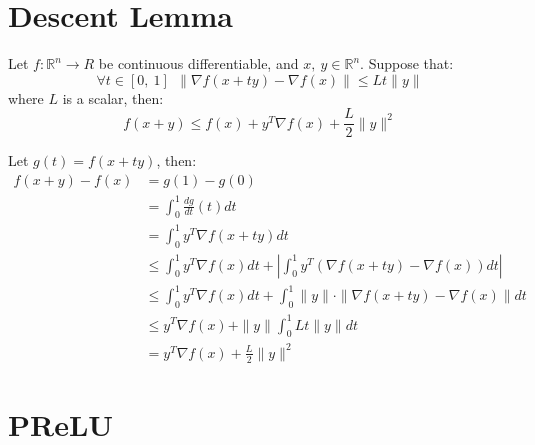 \newpage
{}

\begin{appendices}
    


\section{Descent Lemma}
\label{app:DL}
\begin{lem}
    Let $ f: \mathbb{R}^n \rightarrow R $ be continuous differentiable,
    and $ x,\ y\in \mathbb{R}^n $. Suppose that:
    \begin{equation}
        \forall t \in [0,\ 1]\ \ \|\nabla f(x+t y)-\nabla f(x)\| \leq L t\|y\|
    \end{equation}
    where $ L $ is a scalar, then:
    \begin{equation}
        f(x+y) \leq f(x)+y^{T} \nabla f(x)+\frac{L}{2}\|y\|^{2}
    \end{equation}
\end{lem}

\begin{prf}
    Let $ g(t) = f(x+ty) $, then: \\
\begin{align}
    f(x+y)-f(x) & =g(1)-g(0) \\
    &=\int_{0}^{1} \frac{d g}{d t}(t) d t \\
    &=\int_{0}^{1} y^{T} \nabla f(x+t y) d t \\ 
    & \leq \int_{0}^{1} y^{T} \nabla f(x) d t+\left|\int_{0}^{1} y^{T}(\nabla f(x+t y)-\nabla f(x)) d t\right| \\ 
    & \leq \int_{0}^{1} y^{T} \nabla f(x) d t+\int_{0}^{1}\|y\| \cdot\|\nabla f(x+t y)-\nabla f(x)\| d t \\ 
    & \leq y^{T} \nabla f(x)+\|y\| \int_{0}^{1} L t\|y\| d t \\ 
    &=y^{T} \nabla f(x)+\frac{L}{2}\|y\|^{2} 
\end{align}
\end{prf}


\section{PReLU}


\end{appendices}
